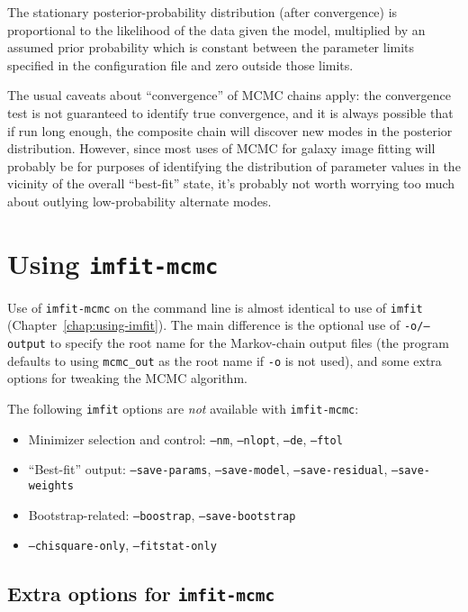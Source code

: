 \documentclass[10pt,a4paper,article]{memoir}
\newcommand{\imfitprog}{\texttt{imfit}}
\newcommand{\imfitmcmc}{\texttt{imfit-mcmc}}
\begin{document}
The stationary posterior-probability distribution (after convergence) is
proportional to the likelihood of the data given the model, multiplied
by an assumed prior probability which is constant between the parameter
limits specified in the configuration file and zero outside those limits.

The usual caveats about ``convergence'' of MCMC chains apply: the convergence
test is not guaranteed to identify true convergence, and it is always possible
that if run long enough, the composite chain will discover new modes in the
posterior distribution. However, since most uses of MCMC for galaxy image fitting
will probably be for purposes of identifying the distribution of parameter
values in the vicinity of the overall ``best-fit'' state, it's probably not
worth worrying too much about outlying low-probability alternate modes.



\section{Using \imfitmcmc{}}

Use of \imfitmcmc{} on the command line is almost identical to use of
\imfitprog{} (Chapter~\ref{chap:using-imfit}). The main difference is
the optional use of \texttt{-o/--output} to specify the root name for
the Markov-chain output files (the program defaults to using
\texttt{mcmc\_out} as the root name if \texttt{-o} is not used), and
some extra options for tweaking the MCMC algorithm.

The following \imfitprog{} options are \textit{not} available with \imfitmcmc:
\begin{itemize}
\item Minimizer selection and control: \texttt{--nm}, \texttt{--nlopt}, \texttt{--de},
\texttt{--ftol}
\item ``Best-fit'' output: \texttt{--save-params}, \texttt{--save-model},
\texttt{--save-residual}, \texttt{--save-weights}
\item Bootstrap-related: \texttt{--boostrap}, \texttt{--save-bootstrap}
\item \texttt{--chisquare-only}, \texttt{--fitstat-only}
\end{itemize}

\subsection{Extra options for \imfitmcmc}
\end{document}
